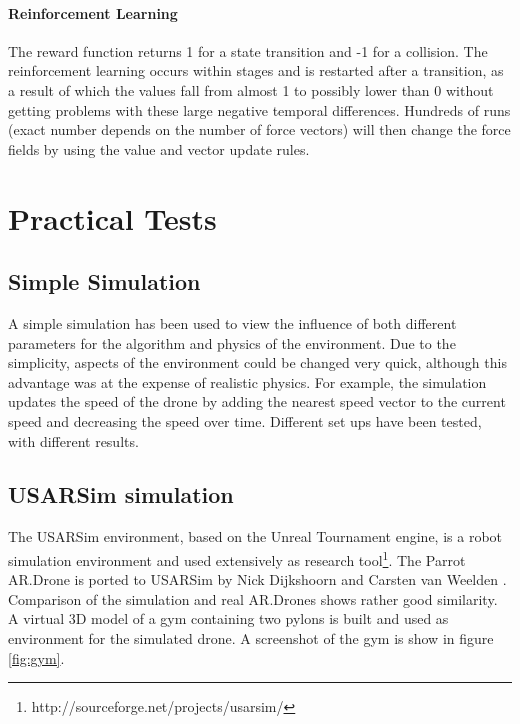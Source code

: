 \documentclass[11pt]{article}
\begin{document}
\paragraph{Reinforcement Learning}
The reward function returns 1 for a state transition and -1 for a collision. The reinforcement learning occurs within stages and is restarted after a transition, as a result of which the values fall from almost 1 to possibly lower than 0 without getting problems with these large negative temporal differences. Hundreds of runs (exact number depends on the number of force vectors) will then change the force fields by using the value and vector update rules.



\section{Practical Tests}
\label{sec:tests}

\subsection{Simple Simulation}
A simple simulation has been used to view the influence of both different parameters for the algorithm and physics of the environment. Due to the simplicity, aspects of the environment could be changed very quick, although this advantage was at the expense of realistic physics. For example, the simulation updates the speed of the drone by adding the nearest speed vector to the current speed and decreasing the speed over time. Different set ups have been tested, with different results.

\subsection{USARSim simulation}
The USARSim environment, based on the Unreal Tournament engine, is a robot simulation environment and used extensively as research tool\footnote{http://sourceforge.net/projects/usarsim/}. The Parrot AR.Drone is ported to USARSim by Nick Dijkshoorn and Carsten van Weelden \cite{nick}. Comparison of the simulation and real AR.Drones shows rather good similarity. A virtual 3D model of a gym containing two pylons is built and used as environment for the simulated drone. A screenshot of the gym is show in figure \ref{fig:gym}.
\end{document}
